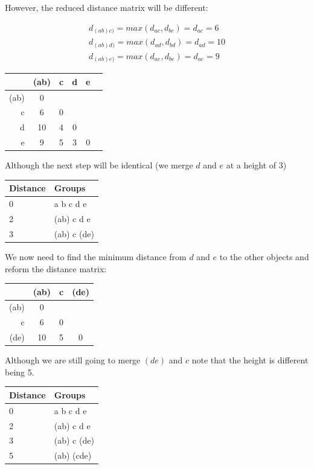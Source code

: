 However, the reduced distance matrix will be different:

\begin{eqnarray*}
d_{(ab)c)} = max(d_{ac},d_{bc}) = d_{ac} = 6\\
d_{(ab)d)} = max(d_{ad},d_{bd}) = d_{ad} = 10\\
d_{(ab)e)} = max(d_{ae},d_{be}) = d_{ae} = 9
\end{eqnarray*}

\begin{minipage}[c]{0.5\textwidth}
\begin{tabular}{r|ccccc}
 & (ab) & c & d & e\\
\hline
(ab) & 0  &   &   &  \\
c    & 6  & 0 &   &  \\
d    & 10 & 4 & 0 &  \\
e    & 9  & 5 & 3 & 0\\
\end{tabular}
\end{minipage}
\begin{minipage}[c]{0.5\textwidth}
Although the next step will be identical (we merge $d$ and $e$ at a height of 3)

\begin{tabular}{ll}
Distance & Groups\\
\hline
0 & a b c d e\\
2 & (ab) c d e\\
3 & (ab) c (de)
\end{tabular}
\end{minipage}

We now need to find the minimum distance from $d$ and $e$ to the other objects and reform the distance matrix:

\begin{minipage}[c]{0.5\textwidth}
\begin{tabular}{r|ccc}
 & (ab) & c & (de)\\
\hline
(ab) & 0 &   &    \\
c    & 6 & 0 &   \\
(de) & 10 & 5 & 0  \\
\end{tabular}
\end{minipage}
\begin{minipage}[c]{0.5\textwidth}
Although we are still going to merge $(de)$ and $c$ note that the height is different being 5.

\begin{tabular}{ll}
Distance & Groups\\
\hline
0 & a b c d e\\
2 & (ab) c d e\\
3 & (ab) c (de)\\
5 & (ab) (cde)
\end{tabular}
\end{minipage}

